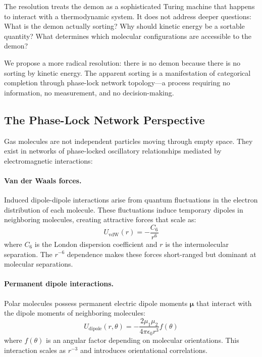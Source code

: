 \documentclass[twocolumn,showpacs,preprintnumbers,amsmath,amssymb,prd]{revtex4-2}
\theoremstyle{definition}
\theoremstyle{remark}
\newcommand{\vdW}{\text{vdW}}
\begin{document}
The resolution treats the demon as a sophisticated Turing machine that happens to interact with a thermodynamic system. It does not address deeper questions: What is the demon actually sorting? Why should kinetic energy be a sortable quantity? What determines which molecular configurations are accessible to the demon?

We propose a more radical resolution: there is no demon because there is no sorting by kinetic energy. The apparent sorting is a manifestation of categorical completion through phase-lock network topology---a process requiring no information, no measurement, and no decision-making.

\subsection{The Phase-Lock Network Perspective}

Gas molecules are not independent particles moving through empty space. They exist in networks of phase-locked oscillatory relationships mediated by electromagnetic interactions:

\paragraph{Van der Waals forces.} Induced dipole-dipole interactions arise from quantum fluctuations in the electron distribution of each molecule. These fluctuations induce temporary dipoles in neighboring molecules, creating attractive forces that scale as:
\begin{equation}
U_{\vdW}(r) = -\frac{C_6}{r^6}
\label{eq:vdw}
\end{equation}
where $C_6$ is the London dispersion coefficient and $r$ is the intermolecular separation. The $r^{-6}$ dependence makes these forces short-ranged but dominant at molecular separations.

\paragraph{Permanent dipole interactions.} Polar molecules possess permanent electric dipole moments $\bm{\mu}$ that interact with the dipole moments of neighboring molecules:
\begin{equation}
U_{\text{dipole}}(r, \theta) = -\frac{2\mu_1 \mu_2}{4\pi\epsilon_0 r^3} f(\theta)
\label{eq:dipole}
\end{equation}
where $f(\theta)$ is an angular factor depending on molecular orientations. This interaction scales as $r^{-3}$ and introduces orientational correlations.
\end{document}

